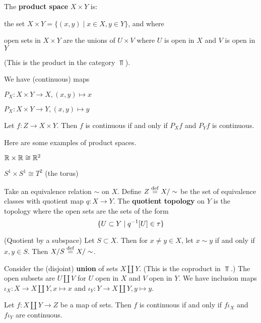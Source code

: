 \begin{defn}
	The \textbf{product space} $X \times Y$ is:
	\begin{itm}
		\item the set $X \times Y = \{(x,y) \mid x \in X, y \in Y\}$, and where
		\item open sets in $X \times Y$ are the unions of $U \times V$ where $U$ is open in $X$ and $V$ is open in $Y$
	\end{itm}
	(This is the product in the category $\Top$).
\end{defn}

We have (continuous) maps
\begin{itm}
	\item $P_X: X \times Y \to X, (x,y) \mapsto x$
	\item $P_X: X \times Y \to Y, (x,y) \mapsto y$
\end{itm}

\begin{exer}
	Let $f: Z \to X \times Y$.
	Then $f$ is continuous if and only if $P_Xf$ and $P_Yf$ is continuous.
\end{exer}

\begin{exam}
	Here are some examples of product spaces.
	\begin{itm}
		\item $\mathbb{R} \times \mathbb{R} \cong \mathbb{R}^2$
		\item $S^1 \times S^1 \cong T^2$ (the torus)
	\end{itm}
\end{exam}

\begin{defn}
	Take an equivalence relation $\sim$ on $X$.
	Define $Z \overset{\mathrm{def}}{=} X/\sim$ be the set of equivalence classes with quotient map $q: X \to Y$.
	The \textbf{quotient topology} on $Y$ is the topology where the open sets are the sets of the form
	\[\{U \subset Y \mid q^{-1}[U] \in \tau\}\]
\end{defn}

\begin{exam}
	(Quotient by a subspace)
	Let $S \subset X$.
	Then for $x \neq y \in X$, let $x\sim y$ if and only if $x,y \in S$.
	Then $X/S \overset{\mathrm{def}}{=} X/\sim$.
\end{exam}

\begin{defn}
	Consider the (disjoint) \textbf{union} of sets $X \amalg Y$. (This is the coproduct in $\Top$.)
	The open subsets are $U \amalg V$ for $U$ open in $X$ and $V$ open in $Y$.
	We have inclusion maps $\iota_X: X \to X \amalg Y, x \mapsto x$ and $\iota_Y: Y \to X \amalg Y, y \mapsto y$.
\end{defn}

\begin{exer}
	Let $f: X \amalg Y \to Z$ be a map of sets.
	Then $f$ is continuous if and only if $f\iota_X$ and $f\iota_Y$ are continuous.
\end{exer}
